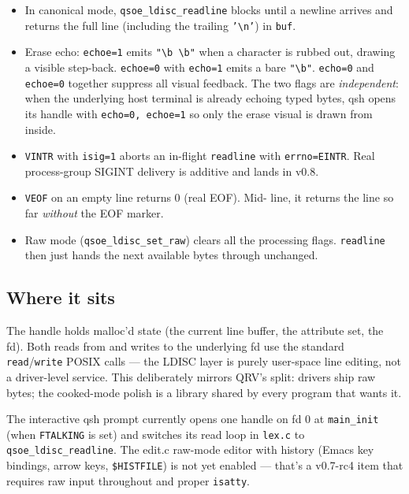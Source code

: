 \begin{itemize}
    \item In canonical mode, \texttt{qsoe\_ldisc\_readline} blocks until
          a newline arrives and returns the full line (including the
          trailing \texttt{'\textbackslash{}n'}) in \texttt{buf}.
    \item Erase echo: \texttt{echoe=1} emits \texttt{"\textbackslash{}b
          \textbackslash{}b"} when a character is rubbed out, drawing a
          visible step-back.  \texttt{echoe=0} with \texttt{echo=1}
          emits a bare \texttt{"\textbackslash{}b"}.  \texttt{echo=0}
          and \texttt{echoe=0} together suppress all visual feedback.
          The two flags are \emph{independent}: when the underlying
          host terminal is already echoing typed bytes, qsh opens its
          handle with \texttt{echo=0, echoe=1} so only the erase visual
          is drawn from inside.
    \item \texttt{VINTR} with \texttt{isig=1} aborts an in-flight
          \texttt{readline} with \texttt{errno=EINTR}.  Real
          process-group SIGINT delivery is additive and lands in v0.8.
    \item \texttt{VEOF} on an empty line returns 0 (real EOF).  Mid-
          line, it returns the line so far \emph{without} the EOF
          marker.
    \item Raw mode (\texttt{qsoe\_ldisc\_set\_raw}) clears all the
          processing flags.  \texttt{readline} then just hands the next
          available bytes through unchanged.
\end{itemize}

\subsection{Where it sits}

The handle holds malloc'd state (the current line buffer, the
attribute set, the fd).  Both reads from and writes to the underlying
fd use the standard \texttt{read}/\texttt{write} POSIX calls --- the
LDISC layer is purely user-space line editing, not a driver-level
service.  This deliberately mirrors QRV's split: drivers ship raw
bytes; the cooked-mode polish is a library shared by every program
that wants it.

The interactive qsh prompt currently opens one handle on fd 0 at
\texttt{main\_init} (when \texttt{FTALKING} is set) and switches its
read loop in \texttt{lex.c} to \texttt{qsoe\_ldisc\_readline}.  The
edit.c raw-mode editor with history (Emacs key bindings, arrow keys,
\texttt{\$HISTFILE}) is not yet enabled --- that's a v0.7-rc4 item
that requires raw input throughout and proper \texttt{isatty}.

